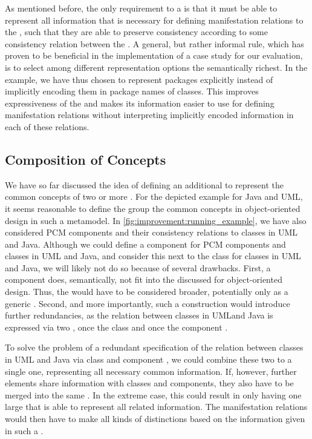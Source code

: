 As mentioned before, the only requirement to a \conceptmetamodel is that it must be able to represent all information that is necessary for defining manifestation relations to the \concretemetamodels, such that they are able to preserve consistency according to some consistency relation between the \concretemetamodels.
A general, but rather informal rule, which has proven to be beneficial in the implementation of a case study for our evaluation, is to select among different representation options the semantically richest.
In the example, we have thus chosen to represent packages explicitly instead of implicitly encoding them in package names of classes.
This improves expressiveness of the \conceptmetamodel and makes its information easier to use for defining manifestation relations without interpreting implicitly encoded information in each of these relations.


\subsection{Composition of Concepts}

We have so far discussed the idea of defining an additional \conceptmetamodel to represent the common concepts of two or more \concretemetamodels.
For the depicted example for Java and \gls{UML}, it seems reasonable to define the group the common concepts in object-oriented design in such a metamodel.
In \autoref{fig:improvement:running_example}, we have also considered \gls{PCM} components and their consistency relations to classes in \gls{UML} and Java.
Although we could define a component \commonality for \gls{PCM} components and classes in \gls{UML} and Java, and consider this \commonality next to the class \commonality for classes in \gls{UML} and Java, we will likely not do so because of several drawbacks.
First, a component \commonality does, semantically, not fit into the discussed \conceptmetamodel for object-oriented design. Thus, the \conceptmetamodel would have to be considered broader, potentially only as a generic \conceptmetamodel.
Second, and more importantly, such a construction would introduce further redundancies, as the relation between classes in \gls{UML}and Java is expressed via two \commonalities, once the class \commonality and once the component \commonality.

To solve the problem of a redundant specification of the relation between classes in \gls{UML} and Java via class and component \commonalities, we could combine these two \commonalities to a single one, representing all necessary common information.
If, however, further elements share information with classes and components, they also have to be merged into the same \commonality.
In the extreme case, this could result in only having one large \commonality that is able to represent all related information.
The manifestation relations would then have to make all kinds of distinctions based on the information given in such a \commonality.

